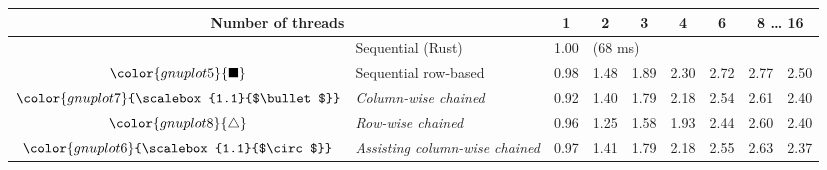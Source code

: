 \begin{tabular}{clrrrrrrr}
\toprule
\multicolumn{2}{c}{\textbf{Number of threads}} & \multicolumn{1}{c}{\textbf{ 1 }} & \multicolumn{1}{c}{\textbf{ 2 }} & \multicolumn{1}{c}{\textbf{ 3 }} & \multicolumn{1}{c}{\textbf{ 4 }} & \multicolumn{1}{c}{\textbf{ 6 }} & \multicolumn{2}{c}{\textbf{ 8 } \dots \textbf{ 16 }} \\
\midrule
& Sequential (Rust) & \multicolumn{1}{r}{ 1.00 } & \multicolumn{ 6 }{l}{(68 ms)} \\
\rowcolor{gnuplot5!10}$\color{gnuplot5}{\blacksquare}$ & Sequential row-based & \cellcolor{gnuplot5!10} 0.98 & \cellcolor{gnuplot5!10} 1.48 & \cellcolor{gnuplot5!10} 1.89 & \cellcolor{gnuplot5!10} 2.30 & \cellcolor{gnuplot5!10} 2.72 & \cellcolor{gnuplot5!10} 2.77 & \cellcolor{gnuplot5!10} 2.50 \\
\rowcolor{gnuplot7!30}$\color{gnuplot7}{\scalebox{1.1}{$\bullet$}}$ & \textit{Column-wise chained} & \cellcolor{gnuplot7!30} 0.92 & \cellcolor{gnuplot7!30} 1.40 & \cellcolor{gnuplot7!30} 1.79 & \cellcolor{gnuplot7!30} 2.18 & \cellcolor{gnuplot7!30} 2.54 & \cellcolor{gnuplot7!30} 2.61 & \cellcolor{gnuplot7!30} 2.40 \\
\rowcolor{gnuplot8!30}$\color{gnuplot8}{\triangle}$ & \textit{Row-wise chained} & \cellcolor{gnuplot8!30} 0.96 & \cellcolor{gnuplot8!30} 1.25 & \cellcolor{gnuplot8!30} 1.58 & \cellcolor{gnuplot8!30} 1.93 & \cellcolor{gnuplot8!30} 2.44 & \cellcolor{gnuplot8!30} 2.60 & \cellcolor{gnuplot8!30} 2.40 \\
\rowcolor{gnuplot6!30}$\color{gnuplot6}{\scalebox{1.1}{$\circ$}}$ & \textit{Assisting column-wise chained} & \cellcolor{gnuplot6!30} 0.97 & \cellcolor{gnuplot6!30} 1.41 & \cellcolor{gnuplot6!30} 1.79 & \cellcolor{gnuplot6!30} 2.18 & \cellcolor{gnuplot6!30} 2.55 & \cellcolor{gnuplot6!30} 2.63 & \cellcolor{gnuplot6!30} 2.37 \\
\bottomrule
\end{tabular}
